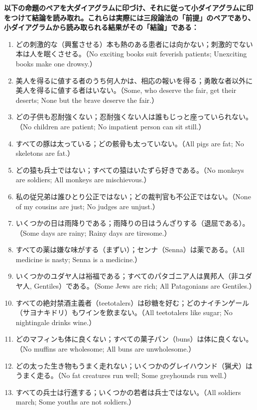 \documentclass[a4paper,11pt,openany]{ltjsbook}
\begin{document}
\noindent\textbf{以下の命題のペアを大ダイアグラムに印づけ、それに従って小ダイアグラムに印をつけて結論を読み取れ。これらは実際には三段論法の「前提」のペアであり、小ダイアグラムから読み取られる結果がその「結論」である：}

\begin{enumerate}[label=\textbf{\arabic*.}, start=13]
\item どの刺激的な（興奮させる）本も熱のある患者には向かない；刺激的でない本は人を眠くさせる。（No exciting books suit feverish patients; Unexciting books make one drowsy.）
\item 美人を得るに値する者のうち何人かは、相応の報いを得る；勇敢な者以外に美人を得るに値する者はいない。（Some, who deserve the fair, get their deserts; None but the brave deserve the fair.）
\item どの子供も忍耐強くない；忍耐強くない人は誰もじっと座っていられない。（No children are patient; No impatient person can sit still.）
\item すべての豚は太っている；どの骸骨も太っていない。（All pigs are fat; No skeletons are fat.）
\item どの猿も兵士ではない；すべての猿はいたずら好きである。（No monkeys are soldiers; All monkeys are mischievous.）
\item 私の従兄弟は誰ひとり公正ではない；どの裁判官も不公正ではない。（None of my cousins are just; No judges are unjust.）
\item いくつかの日は雨降りである；雨降りの日はうんざりする（退屈である）。（Some days are rainy; Rainy days are tiresome.）
\item すべての薬は嫌な味がする（まずい）；センナ（Senna）は薬である。（All medicine is nasty; Senna is a medicine.）
\item いくつかのユダヤ人は裕福である；すべてのパタゴニア人は異邦人（非ユダヤ人, Gentiles）である。（Some Jews are rich; All Patagonians are Gentiles.）
\item すべての絶対禁酒主義者（teetotalers）は砂糖を好む；どのナイチンゲール（サヨナキドリ）もワインを飲まない。（All teetotalers like sugar; No nightingale drinks wine.）
\item どのマフィンも体に良くない；すべての菓子パン（buns）は体に良くない。（No muffins are wholesome; All buns are unwholesome.）
\item どの太った生き物もうまく走れない；いくつかのグレイハウンド（猟犬）はうまく走る。（No fat creatures run well; Some greyhounds run well.）
\item すべての兵士は行進する；いくつかの若者は兵士ではない。（All soldiers march; Some youths are not soldiers.）

\end{enumerate}
\end{document}
